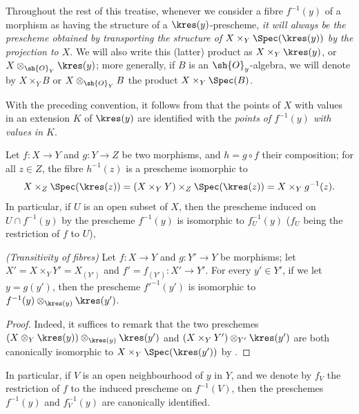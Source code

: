 \begin{env}[3.6.2]
\label{I.3.6.2}
Throughout the rest of this treatise, whenever we consider a fibre $f^{-1}(y)$ of a morphism as having the structure of a $\kres(y)$-prescheme, \emph{it will always be the prescheme obtained by transporting the structure of $X\times_Y\Spec(\kres(y))$ by the projection to $X$}.
We will also write this (latter) product as $X\times_Y\kres(y)$, or $X\otimes_{\sh{O}_Y}\kres(y)$; more generally, if $B$ is an $\sh{O}_y$-algebra, we will denote by $X\times_Y B$ or $X\otimes_{\sh{O}_Y}B$ the product $X\times_Y\Spec(B)$.
\end{env}

With the preceding convention, it follows from  that the points of $X$ with values in an extension $K$ of $\kres(y)$ are identified with the \emph{points of $f^{-1}(y)$ with values in $K$}.

\begin{env}[3.6.3]
\label{I.3.6.3}
Let $f:X\to Y$ and $g:Y\to Z$ be two morphisms, and $h=g\circ f$ their composition; for all $z\in Z$, the fibre $h^{-1}(z)$ is a prescheme isomorphic to
\[
  X\times_Z\Spec(\kres(z))=(X\times_Y Y)\times_Z\Spec(\kres(z))=X\times_Y g^{-1}(z).
\]
In particular, if $U$ is an open subset of $X$, then the prescheme induced on $U\cap f^{-1}(y)$ by the prescheme $f^{-1}(y)$ is isomorphic to $f^{-1}_U(y)$ ($f_U$ being the restriction of $f$ to $U$),
\end{env}

\begin{proposition}[3.6.4]
\label{I.3.6.4}
\emph{(Transitivity of fibres)}
Let $f:X\to Y$ and $g:Y'\to Y$ be morphisms; let $X'=X\times_Y Y'=X_{(Y')}$ and $f'=f_{(Y')}:X'\to Y'$.
For every $y'\in Y'$, if we let $y=g(y')$, then the prescheme $f'^{-1}(y')$ is isomorphic to $f^{-1}(y)\otimes_{\kres(y)}\kres(y')$.
\end{proposition}

\begin{proof}
Indeed, it suffices to remark that the two preschemes $(X\otimes_Y\kres(y))\otimes_{\kres(y)}\kres(y')$ and $(X\times_Y Y')\otimes_{Y'}\kres(y')$ are both canonically isomorphic to $X\times_Y\Spec(\kres(y'))$ by .
\end{proof}

In particular, if $V$ is an open neighbourhood of $y$ in $Y$, and we denote by $f_V$ the restriction of $f$ to the induced prescheme on $f^{-1}(V)$, then the preschemes $f^{-1}(y)$ and $f^{-1}_V(y)$ are canonically identified.


